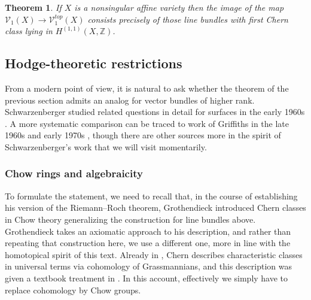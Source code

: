 \documentclass[11pt,leqno]{article}
\newcommand{\Z}{{\mathbb Z}}
\renewcommand{\1}{{\rm 1\hspace*{-0.4ex}%
\rule{0.1ex}{1.52ex}\hspace*{0.2ex}}}
\newcommand{\<}[1]{{\langle}#1 {\rangle}}
\newcounter{intro}
\theoremstyle{plain}
\newtheorem{theorem}{Theorem}[subsection]
\theoremstyle{definition}
\theoremstyle{remark}
\numberwithin{equation}{subsection}
\begin{document}
\begin{theorem}
	\label{thm:algebraiclinebundlesonaffinevars}
	If $X$ is a nonsingular affine variety then the image of the map $\mathscr{V}_1(X) \to \mathscr{V}_1^{top}(X)$ consists precisely of those line bundles with first Chern class lying in $H^{(1,1)}(X,\Z)$. 
\end{theorem}

\subsection{Hodge-theoretic restrictions}
\label{ss:hodgetheory}
From a modern point of view, it is natural to ask whether the theorem of the previous section admits an analog for vector bundles of higher rank.  Schwarzenberger studied related questions in detail for surfaces in the early 1960s \cite{Schwarzenberger1961VectorBundlesP2,Schwarzenberger1961VectorBundles}.  A more systematic comparison can be traced to work of Griffiths in the late 1960s and early 1970s \cite{Griffiths1972FunctionTheoryIA,Griffiths1972FunctionTheoryIB}, though there are other sources more in the spirit of Schwarzenberger's work that we will visit momentarily.

\subsubsection*{Chow rings and algebraicity}
To formulate the statement, we need to recall that, in the course of establishing his version of the Riemann--Roch theorem, Grothendieck introduced Chern classes in Chow theory \cite{Grothendieck1958Chern} generalizing the construction for line bundles above.  Grothendieck takes an axiomatic approach to his description, and rather than repeating that construction here, we use a different one, more in line with the homotopical spirit of this text.  Already in \cite[Chapter III.1]{Chern1946}, Chern describes characteristic classes in universal terms via cohomology of Grassmannians, and this description was given a textbook treatment in \cite[\S 14]{MilnorStasheff1974}.  In this account, effectively we simply have to replace cohomology by Chow groups.    
\end{document}
